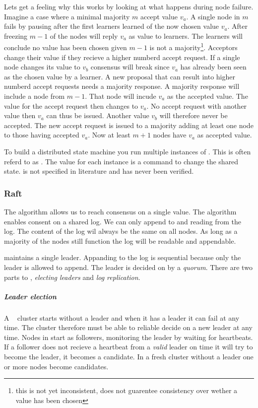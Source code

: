Lets get a feeling why this works by looking at what happens during node failure. Imagine a case where a minimal majority $m$ accept value $v_a$. A single node in $m$ fails by pausing after the first learners learned of the now chosen value $v_a$. After freezing $m-1$ of the nodes will reply $v_a$ as value to learners. The learners will conclude no value has been chosen given $m-1$ is not a majority\footnote{this is not yet inconsistent, \paxos{} does not guarentee consistency over wether a value has been chosen}. Acceptors change their value if they recieve a higher numberd accept request. If a single node changes its value to $v_b$ consensus will break since $v_a$ has already been seen as the chosen value by a learner. A new proposal that can result into higher numberd accept requests needs a majority response. A majority response will include a node from $m-1$. That node will incude $v_a$ as the accepted value. The value for the accept request then changes to $v_a$. No accept request with another value then $v_a$ can thus be issued. Another value $v_b$ will therefore never be accepted. The new accept request is issued to a majority adding at least one node to those having accepted $v_a$. Now at least $m+1$ nodes have $v_a$ as accepted value.

To build a distributed state machine you run multiple instances of \paxos{}. This is often referd to as \multipaxos{}. The value for each instance is a command to change the shared state. \multipaxos{} is not specified in literature and has never been verified.

\subsubsection*{Raft} \label{sec:raft}
The \paxos{} algorithm allows us to reach consensus on a single value. The \raft{} algorithm enables consent on a shared log. We can only append to and reading from the log. The content of the log wil always be the same on all nodes. As long as a majority of the nodes still function the log will be readable and appendable.

\raft{} maintains a single leader. Appanding to the log is sequential because only the leader is allowed to append. The leader is decided on by a \textit{quorum}. There are two parts to \raft{}, \textit{electing leaders} and \textit{log replication}.

\subparagraph{Leader election} \label{sec:valid}
A \raft{}~\cite{raft} cluster starts without a leader and when it has a leader it can fail at any time. The cluster therefore must be able to reliable decide on a new leader at any time. Nodes in \raft{} start as followers, monitoring the leader by waiting for heartbeats. If a follower does not recieve a heartbeat from a \emph{valid} leader on time it will try to become the leader, it becomes a candidate. In a fresh cluster without a leader one or more nodes become candidates.

